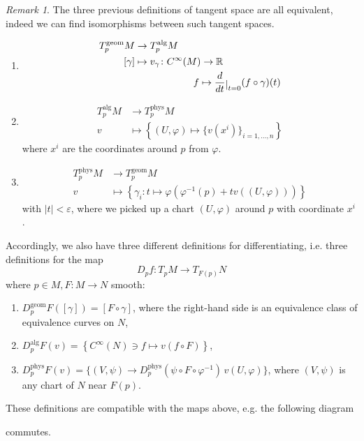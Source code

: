 \documentclass[a4paper,11pt,titlepage, article, oneside]{memoir}
\numberwithin{equation}{section}
\theoremstyle{definition}
\theoremstyle{remark}
\newtheorem{remark}[theorem]{Remark}
\newcommand{\rfield}{\mathbb{R}}
\newcommand{\restrict}[2]{{#1}\raisebox{-.5ex}{$|$}_{#2}}
\newcommand{\diondi}[1]{\frac{d}{d{#1}}}
\newcommand{\tangentgeom}[1]{T_{#1}^{\text{geom}}}
\newcommand{\tangentphys}[1]{T_{#1}^{\text{phys}}}
\newcommand{\tangentalg}[1]{T_{#1}^{\text{alg}}}
\begin{document}
\begin{remarkbox}\begin{remark} \label{equivremark}
The three previous definitions of tangent space are all equivalent, indeed we can find isomorphisms between such tangent spaces.
\begin{enumerate}
\item
\begin{align}
\tangentgeom{p}M &\rightarrow \tangentalg{p}M  \\
[\gamma] &\mapsto v_{\gamma}\colon C^{\infty}(M) \rightarrow \rfield \\
& \qquad \qquad \qquad f \mapsto \restrict{\diondi{t}}{t=0} (f\circ \gamma)(t)
\end{align}
\item 
\begin{align}
\tangentalg{p}M &\rightarrow \tangentphys{p}M  \\
v &\mapsto \left \{ (U, \varphi) \mapsto\{v(x^i)\}_{i=1, \ldots, n} \right \}
\end{align}
where $x^i$ are the coordinates around $p$ from $\varphi$.
\item 
\begin{align}
\tangentphys{p}M &\rightarrow \tangentgeom{p}M  \\
v &\mapsto \left\{ \gamma_i \colon t \mapsto \varphi(\varphi^{-1}(p) + tv((U, \varphi)))\right\}
\end{align}
with $|t| < \varepsilon$, where we picked up a chart $(U, \varphi)$ around $p$ with coordinate $x^i$.
\end{enumerate}
Accordingly, we also have three different definitions for differentiating, i.e. three definitions for the map
\begin{equation}
D_p f \colon T_pM \rightarrow T_{F(p)} N
\end{equation}
where $p \in M, F \colon M \rightarrow N$ smooth:
\begin{enumerate}
\item $D_p^{\text{geom}} F ([\gamma]) = [F \circ \gamma]$, where the right-hand side is an equivalence class of equivalence curves on $N$,
\item $D_p^{\text{alg}} F (v) = \left \{C^{\infty}(N) \ni f \mapsto v(f \circ F) \right \}$,
\item $D_p^{\text{phys}} F(v) = \{ (V, \psi) \rightarrow D_p^{\text{phys}} (\psi \circ F \circ \varphi^{-1})\, v(U, \varphi)\}$, where $(V, \psi)$ is any chart of $N$ near $F(p)$.
\end{enumerate}
These definitions are compatible with the maps above, e.g. the following diagram
\begin{center}
\end{center}
commutes.
\end{remark}\end{remarkbox}
\end{document}
